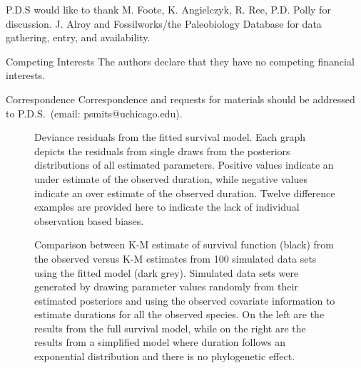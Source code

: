 \documentclass{nature}
\begin{document}




\begin{addendum}
\item P.D.S would like to thank M. Foote, K. Angielczyk, R. Ree, P.D. Polly for discussion. J. Alroy and Fossilworks/the Paleobiology Database for data gathering, entry, and availability.
\item[Competing Interests] The authors declare that they have no
  competing financial interests.
\item[Correspondence] Correspondence and requests for materials
  should be addressed to P.D.S.~(email: psmits@uchicago.edu).
\end{addendum}




\begin{figure}[ht]
  \caption{Deviance residuals from the fitted survival model. Each graph depicts the residuals from single draws from the posteriors distributions of all estimated parameters. Positive values indicate an under estimate of the observed duration, while negative values indicate an over estimate of the observed duration. Twelve difference examples are provided here to indicate the lack of individual observation based biases.}
  \label{fig:ppc_res}
\end{figure}

\begin{figure}[ht]
  \caption{Comparison between K-M estimate of survival function (black) from the observed versus K-M estimates from 100 simulated data sets using the fitted model (dark grey). Simulated data sets were generated by drawing parameter values randomly from their estimated posteriors and using the observed covariate information to estimate durations for all the observed species. On the left are the results from the full survival model, while on the right are the results from a simplified model where duration follows an exponential distribution and there is no phylogenetic effect.}
  \label{fig:ppc_surv}
\end{figure}
\end{document}
